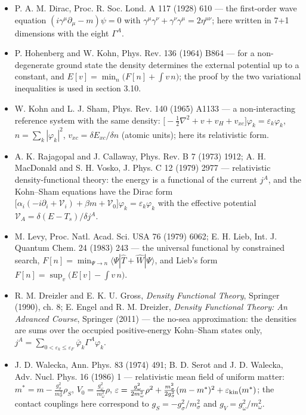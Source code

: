 \documentclass[10pt,a4paper]{article}
\begin{document}
\begin{itemize}
\item P. A. M. Dirac, Proc. R. Soc. Lond. A 117 (1928) 610 — the first-order wave equation $(i\gamma^\mu\partial_\mu-m)\psi=0$ with $\gamma^\mu\gamma^\nu+\gamma^\nu\gamma^\mu=2\eta^{\mu\nu}$; here written in 7+1 dimensions with the eight $\Gamma^A$.
\item P. Hohenberg and W. Kohn, Phys. Rev. 136 (1964) B864 — for a non-degenerate ground state the density determines the external potential up to a constant, and $E[v]=\min_n\big(F[n]+\int v\,n\big)$; the proof by the two variational inequalities is used in section 3.10.
\item W. Kohn and L. J. Sham, Phys. Rev. 140 (1965) A1133 — a non-interacting reference system with the same density: $\big[-\tfrac12\nabla^2+v+v_H+v_{xc}\big]\varphi_k=\varepsilon_k\varphi_k$, $n=\sum_k|\varphi_k|^2$, $v_{xc}=\delta E_{xc}/\delta n$ (atomic units); here its relativistic form.
\item A. K. Rajagopal and J. Callaway, Phys. Rev. B 7 (1973) 1912; A. H. MacDonald and S. H. Vosko, J. Phys. C 12 (1979) 2977 — relativistic density-functional theory: the energy is a functional of the current $j^A$, and the Kohn–Sham equations have the Dirac form $\big[\alpha_i(-i\partial_i+\mathcal V_i)+\beta m+\mathcal V_0\big]\varphi_k=\varepsilon_k\varphi_k$ with the effective potential $\mathcal V_A=\delta(E-T_s)/\delta j^A$.
\item M. Levy, Proc. Natl. Acad. Sci. USA 76 (1979) 6062; E. H. Lieb, Int. J. Quantum Chem. 24 (1983) 243 — the universal functional by constrained search, $F[n]=\min_{\Psi\to n}\langle\Psi|\hat T+\hat W|\Psi\rangle$, and Lieb’s form $F[n]=\sup_v\big(E[v]-\int v\,n\big)$.
\item R. M. Dreizler and E. K. U. Gross, \emph{Density Functional Theory}, Springer (1990), ch. 8; E. Engel and R. M. Dreizler, \emph{Density Functional Theory: An Advanced Course}, Springer (2011) — the no-sea approximation: the densities are sums over the occupied positive-energy Kohn–Sham states only, $j^A=\sum_{0<\varepsilon_k\le\varepsilon_F}\bar\varphi_k\Gamma^A\varphi_k$.
\item J. D. Walecka, Ann. Phys. 83 (1974) 491; B. D. Serot and J. D. Walecka, Adv. Nucl. Phys. 16 (1986) 1 — relativistic mean field of uniform matter: $m^*=m-\frac{g_\sigma^2}{m_\sigma^2}\rho_S$, $V_0=\frac{g_\omega^2}{m_\omega^2}\rho$, $\varepsilon=\frac{g_\omega^2}{2m_\omega^2}\rho^2+\frac{m_\sigma^2}{2g_\sigma^2}(m-m^*)^2+\varepsilon_{\rm kin}(m^*)$; the contact couplings here correspond to $g_S=-g_\sigma^2/m_\sigma^2$ and $g_V=g_\omega^2/m_\omega^2$.

\end{itemize}
\end{document}
